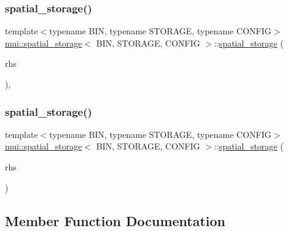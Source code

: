\subsubsection{\texorpdfstring{spatial\+\_\+storage()}{spatial\_storage()}\hspace{0.1cm}{\footnotesize\ttfamily [3/4]}}
{\footnotesize\ttfamily template$<$typename B\+IN, typename S\+T\+O\+R\+A\+GE, typename C\+O\+N\+F\+IG$>$ \\
\hyperlink{classmui_1_1spatial__storage}{mui\+::spatial\+\_\+storage}$<$ B\+IN, S\+T\+O\+R\+A\+GE, C\+O\+N\+F\+IG $>$\+::\hyperlink{classmui_1_1spatial__storage}{spatial\+\_\+storage} (\begin{DoxyParamCaption}\item[{\hyperlink{classmui_1_1spatial__storage}{spatial\+\_\+storage}$<$ B\+IN, S\+T\+O\+R\+A\+GE, C\+O\+N\+F\+IG $>$ \&\&}]{rhs }\end{DoxyParamCaption})\hspace{0.3cm}{\ttfamily [inline]}, {\ttfamily [noexcept]}}

\mbox{\label{classmui_1_1spatial__storage_a0b8280451b180584440d4b1971ee2980}} 
\subsubsection{\texorpdfstring{spatial\+\_\+storage()}{spatial\_storage()}\hspace{0.1cm}{\footnotesize\ttfamily [4/4]}}
{\footnotesize\ttfamily template$<$typename B\+IN, typename S\+T\+O\+R\+A\+GE, typename C\+O\+N\+F\+IG$>$ \\
\hyperlink{classmui_1_1spatial__storage}{mui\+::spatial\+\_\+storage}$<$ B\+IN, S\+T\+O\+R\+A\+GE, C\+O\+N\+F\+IG $>$\+::\hyperlink{classmui_1_1spatial__storage}{spatial\+\_\+storage} (\begin{DoxyParamCaption}\item[{storage\+\_\+t}]{rhs }\end{DoxyParamCaption})\hspace{0.3cm}{\ttfamily [inline]}}



\subsection{Member Function Documentation}
\mbox{\label{classmui_1_1spatial__storage_ab3ba87f495c052e4bfd90af44402c478}} 
